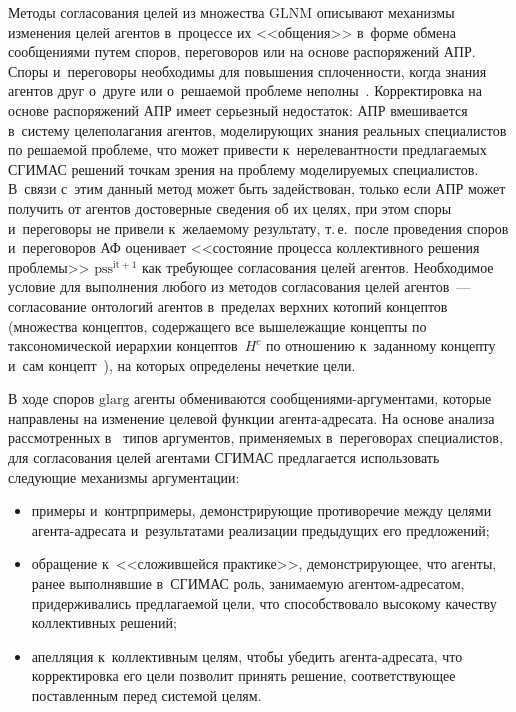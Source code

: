 \begin{multicols}{2}
  Методы согласования целей из множества $\mathrm{GLNM}$ описывают 
механизмы изменения целей агентов в~процессе их <<общения>> в~форме 
обмена сообщениями путем споров, переговоров или на основе распоряжений 
АПР. Споры и~переговоры необходимы для повышения спло\-чен\-ности, когда 
знания агентов друг о~друге или о~ре\-ша\-емой проб\-ле\-ме неполны~\cite{14-kir}. 
Корректировка на основе распоряжений АПР имеет серьезный недостаток: АПР 
вмешивается в~систему целеполагания агентов, моделирующих знания 
реальных специалистов по решаемой проблеме, что может привести 
к~нерелевантности предлагаемых \mbox{СГИМАС} решений точкам зрения на 
проблему моделируемых специалистов. В~связи с~этим данный метод может 
быть задействован, только если АПР может получить от агентов достоверные 
сведения об их целях, при этом споры и~переговоры не привели к~желаемому 
результату, т.\,е.\ после проведения споров и~переговоров АФ оценивает 
<<состояние процесса коллективного решения проб\-ле\-мы>> 
$\mathrm{pss}^{\mathrm{it}+1}$ как требующее согласования целей агентов. 
Необходимое условие для выполнения любого из методов согласования целей 
агентов~--- согласование онтологий агентов в~пределах верхних котопий 
кон\-цеп\-тов (множества кон\-цеп\-тов, содержащего все вышележащие кон\-цеп\-ты по 
таксономической иерархии кон\-цеп\-тов~$H^c$ по отношению к~заданному 
концепту и~сам концепт~\cite{11-kir}), на которых определены нечеткие цели.
  
  В ходе споров $\mathrm{glarg}$ агенты обмениваются  
со\-об\-ще\-ни\-ями-ар\-гу\-мен\-та\-ми, которые на\-прав\-ле\-ны на изменение 
целевой функции аген\-та-ад\-ре\-са\-та. На основе анализа рассмотренных 
в~\cite{14-kir} типов аргументов, применяемых в~переговорах специалистов, 
для согласования целей агентами \mbox{СГИМАС} предлагается использовать 
сле\-ду\-ющие механизмы аргументации: 
  \begin{itemize}
  \item примеры и~контрпримеры, демонстрирующие противоречие между 
целями аген\-та-ад\-ре\-са\-та и~результатами реализации предыдущих его 
предложений; 
  \item обращение к~<<сложившейся практике>>, демонстрирующее, что 
агенты, ранее выполнявшие в~\mbox{СГИМАС} роль, занимаемую  
аген\-том-ад\-ре\-са\-том, придерживались предлагаемой цели, что 
способствовало высокому качеству коллективных решений;
\item апелляция к~коллективным целям, чтобы убедить аген\-та-ад\-ре\-са\-та, 
что корректировка его цели позволит принять решение, соответствующее 
поставленным перед сис\-те\-мой целям.
\end{itemize}


\end{multicols}
